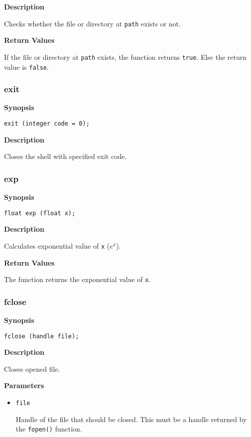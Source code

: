 \documentclass[a4paper, 10pt, titlepage]{article}
\begin{document}
\textbf{Description}

Checks whether the file or directory at \texttt{path} exists or not.

\textbf{Return Values}

If the file or directory at \texttt{path} exists, the function returns \texttt{true}. Else the return value is \texttt{false}.

\subsubsection{exit}

\textbf{Synopsis}

\begin{verbatim}
exit (integer code = 0);
\end{verbatim}

\textbf{Description}

Closes the shell with specified exit code.

\subsubsection{exp}

\textbf{Synopsis}

\begin{verbatim}
float exp (float x);
\end{verbatim}

\textbf{Description}

Calculates exponential value of \texttt{x} ($e^x$).

\textbf{Return Values}

The function returns the exponential value of \texttt{x}.

\subsubsection{fclose}

\textbf{Synopsis}

\begin{verbatim}
fclose (handle file);
\end{verbatim}

\textbf{Description}

Closes opened file.

\textbf{Parameters}

\begin{itemize}
\item \texttt{file}

Handle of the file that should be closed. This must be a handle returned by the \texttt{fopen()} function.
\end{itemize}
\end{document}
